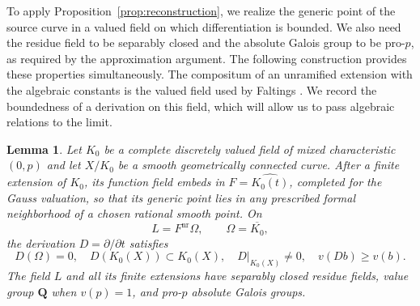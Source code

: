 \documentclass[11pt,a4paper]{article}
\numberwithin{equation}{section}
\theoremstyle{plain}
\newtheorem{lemma}[theorem]{Lemma}
\theoremstyle{definition}
\theoremstyle{remark}
\newcommand{\nr}{\mathrm{nr}}
\renewcommand{\S}{\ensuremath{\mathsection}}
\begin{document}
To apply Proposition~\ref{prop:reconstruction}, we realize the generic
point of the source curve in a valued field on which differentiation is
bounded. We also need the residue field to be separably closed and the
absolute Galois group to be pro-$p$, as required by the approximation
argument. The following construction provides these properties
simultaneously. The compositum of an unramified extension with the
algebraic constants is the valued field used by Faltings
\cite[\S6, pp.~146--147]{Faltings1998}. We record the boundedness of a
derivation on this field, which will allow us to pass algebraic
relations to the limit.

\begin{lemma}
\label{lem:gauss}
Let $K_0$ be a complete discretely valued field of mixed characteristic
$(0,p)$ and let $X/K_0$ be a smooth geometrically connected curve.
After a finite extension of $K_0$, its function field embeds in
$F=\widehat{K_0(t)}$, completed for the Gauss valuation, so that its
generic point lies in any prescribed formal neighborhood of a chosen
rational smooth point. On
\[
 L=F^{\nr}\Omega,\qquad \Omega=\overline{K_0},
\]
the derivation $D=\partial/\partial t$ satisfies
\begin{equation}
 D(\Omega)=0,\quad D(K_0(X))\subset K_0(X),\quad
 D|_{K_0(X)}\ne0,\quad v(Db)\ge v(b).
 \label{eq:bounded-D}
\end{equation}
The field $L$ and all its finite extensions have separably closed residue
fields, value group $\mathbf Q$ when $v(p)=1$, and pro-$p$ absolute
Galois groups.
\end{lemma}
\end{document}
